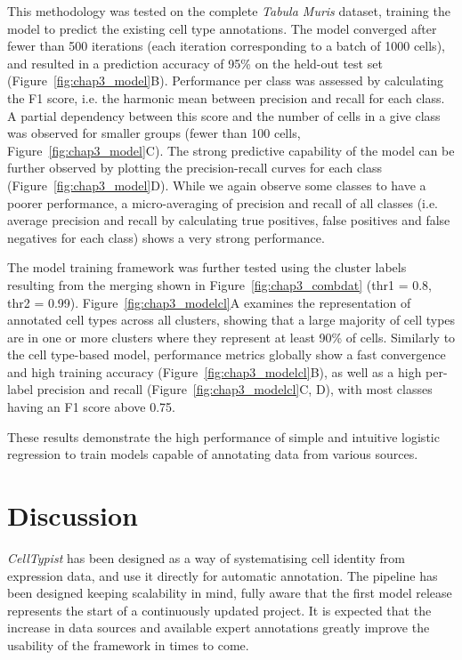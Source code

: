 This methodology was tested on the complete \textit{Tabula Muris} dataset, training the model to predict the existing cell type annotations. The model converged after fewer than 500 iterations (each iteration corresponding to a batch of 1000 cells), and resulted in a prediction accuracy of 95\% on the held-out test set (Figure~\ref{fig:chap3_model}B). Performance per class was assessed by calculating the F1 score, i.e. the harmonic mean between precision and recall for each class. A partial dependency between this score and the number of cells in a give class was observed for smaller groups (fewer than 100 cells, Figure~\ref{fig:chap3_model}C). The strong predictive capability of the model can be further observed by plotting the precision-recall curves for each class (Figure~\ref{fig:chap3_model}D). While we again observe some classes to have a poorer performance, a micro-averaging of precision and recall of all classes (i.e. average precision and recall by calculating true positives, false positives and false negatives for each class) shows a very strong performance.

The model training framework was further tested using the cluster labels resulting from the merging shown in Figure~\ref{fig:chap3_combdat} (thr1 = 0.8, thr2 = 0.99). Figure~\ref{fig:chap3_modelcl}A examines the representation of annotated cell types across all clusters, showing that a large majority of cell types are in one or more clusters where they represent at least 90\% of cells. Similarly to the cell type-based model, performance metrics globally show a fast convergence and high training accuracy (Figure~\ref{fig:chap3_modelcl}B), as well as a high per-label precision and recall (Figure~\ref{fig:chap3_modelcl}C, D), with most classes having an F1 score above 0.75.

These results demonstrate the high performance of simple and intuitive logistic regression to train models capable of annotating data from various sources.



\section{Discussion}
\label{section3.5}
\textit{CellTypist} has been designed as a way of systematising cell identity from expression data, and use it directly for automatic annotation. The pipeline has been designed keeping scalability in mind, fully aware that the first model release represents the start of a continuously updated project. It is expected that the increase in data sources and available expert annotations greatly improve the usability of the framework in times to come.

